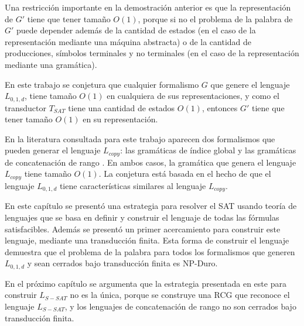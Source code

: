 Una restricción importante en la demostración anterior es que la representación de $G'$ tiene que tener tamaño $O(1)$, porque si no el problema de la palabra de $G'$ puede depender además de la cantidad de estados (en el caso de la representación mediante una máquina abstracta) o de la cantidad de producciones, símbolos terminales y no terminales (en el caso de la representación mediante una gramática).

En este trabajo se conjetura que cualquier formalismo $G$ que genere el lenguaje $L_{0,1,d}$, tiene tamaño $O(1)$ en cualquiera de sus representaciones, y como el transductor $T_{SAT}$ tiene una cantidad de estados $O(1)$, entonces $G'$ tiene que tener tamaño $O(1)$ en su representación.

En la literatura consultada para este trabajo aparecen dos formalismos que pueden generar el lenguaje $L_{copy}$: las gramáticas de índice global \cite{globalIndexLanguages} y las gramáticas de concatenación de rango \cite{propertiesRCGBib}. En ambos casos, la gramática que genera el lenguaje $L_{copy}$ tiene tamaño $O(1)$. La conjetura está basada en el hecho de que el lenguaje $L_{0,1,d}$ tiene características similares al lenguaje $L_{copy}$.

En este capítulo se presentó una estrategia para resolver el SAT usando teoría de lenguajes que se basa en definir y construir el lenguaje de todas las fórmulas satisfacibles. Además se presentó un primer acercamiento para construir este lenguaje, mediante una transducción finita. Esta forma de construir el lenguaje demuestra que el problema de la palabra para todos los formalismos que generen $L_{0,1,d}$ y sean cerrados bajo transducción finita es NP-Duro.

En el próximo capítulo se argumenta que la estrategia presentada en este para construir $L_{S-SAT}$ no es la única, porque se construye una RCG que reconoce el lenguaje $L_{S-SAT}$, y los lenguajes de concatenación de rango no son cerrados bajo transducción finita.
